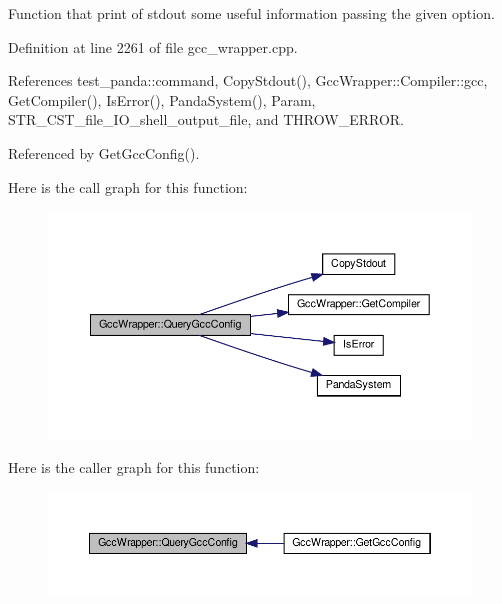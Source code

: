 Function that print of stdout some useful information passing the given option. 



Definition at line 2261 of file gcc\+\_\+wrapper.\+cpp.



References test\+\_\+panda\+::command, Copy\+Stdout(), Gcc\+Wrapper\+::\+Compiler\+::gcc, Get\+Compiler(), Is\+Error(), Panda\+System(), Param, S\+T\+R\+\_\+\+C\+S\+T\+\_\+file\+\_\+\+I\+O\+\_\+shell\+\_\+output\+\_\+file, and T\+H\+R\+O\+W\+\_\+\+E\+R\+R\+OR.



Referenced by Get\+Gcc\+Config().

Here is the call graph for this function\+:
\nopagebreak
\begin{figure}[H]
\begin{center}
\leavevmode
\includegraphics[width=350pt]{d4/dbf/classGccWrapper_a6ddadf157967ed22e87a5453f3bb25db_cgraph}
\end{center}
\end{figure}
Here is the caller graph for this function\+:
\nopagebreak
\begin{figure}[H]
\begin{center}
\leavevmode
\includegraphics[width=350pt]{d4/dbf/classGccWrapper_a6ddadf157967ed22e87a5453f3bb25db_icgraph}
\end{center}
\end{figure}
\mbox{\label{classGccWrapper_a89445158bf3052bd6dfaca4372016516}} 
